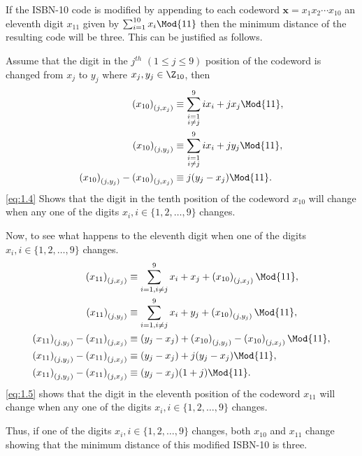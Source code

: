 If the ISBN-10 code is modified by appending to each codeword $\textbf{x}=x_1x_2\cdots x_{10}$ an eleventh digit $x_{11}$ given by $\sum_{i=1}^{10} x_i \Mod{11}$ then the minimum distance of the resulting code will be three. This can be justified as follows.

Assume that the digit in the $j^{th}$  $(1\leq j \leq 9)$ position of the codeword is changed from $x_j$ to $y_j$ where $x_j,y_j \in \Z_{10}$, then
\begin{align}
\label{eq:1.4}
	\left(x_{10}\right)_{(j,x_{j})} &\equiv \sum_{\substack{i=1\\ i\neq j}}^9 ix_i + jx_j \Mod{11},\nonumber\\
	\left(x_{10}\right)_{(j,y_{j})} &\equiv \sum_{\substack{i=1\\ i\neq j}}^9 ix_i + jy_j \Mod{11},\nonumber\\
	\left(x_{10}\right)_{(j,y_{j})} - \left(x_{10}\right)_{(j,x_{j})} &\equiv j(y_j-x_j) \Mod{11}.
\end{align}
\eqref{eq:1.4} Shows that the digit in the tenth position of the codeword $x_{10}$ will change when any one of the digits $x_i, i\in\{1,2,\ldots,9\}$ changes.

Now, to see what happens to the eleventh digit when one of the digits $x_i, i\in\{1,2,\ldots,9\}$ changes.
\begin{align}
\label{eq:1.5}
	\left(x_{11}\right)_{(j,x_j)} &\equiv \sum_{i=1, i\neq j}^9 x_i + x_j + \left(x_{10}\right)_{(j,x_j)}\Mod{11},\nonumber\\
	\left(x_{11}\right)_{(j,y_j)} &\equiv \sum_{i=1, i\neq j}^9 x_i + y_j + \left(x_{10}\right)_{(j,y_j)}\Mod{11},\nonumber\\
	\left(x_{11}\right)_{(j,y_j)}-\left(x_{11}\right)_{(j,x_j)} &\equiv (y_j-x_j) +\left(x_{10}\right)_{(j,y_j)}-\left(x_{10}\right)_{(j,x_j)}\Mod{11},\nonumber\\
	\left(x_{11}\right)_{(j,y_j)}-\left(x_{11}\right)_{(j,x_j)} &\equiv (y_j-x_j) + j(y_j-x_j) \Mod{11},\nonumber\\
	\left(x_{11}\right)_{(j,y_j)}-\left(x_{11}\right)_{(j,x_j)} &\equiv (y_j-x_j)(1 + j) \Mod{11}.
\end{align}
\eqref{eq:1.5} shows that the digit in the eleventh position of the codeword $x_{11}$ will change when any one of the digits $x_i, i\in\{1,2,\ldots,9\}$ changes. 

Thus, if one of the digits $x_i, i\in\{1,2,\ldots,9\}$ changes, both $x_{10}$ and $x_{11}$ change showing that the minimum distance of this modified ISBN-10 is three.


